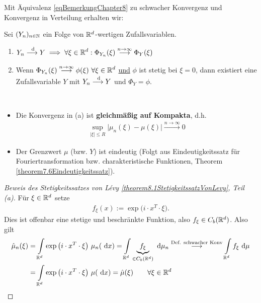 Mit Äquivalenz \eqref{eqBemerkungChapter8} zu schwacher Konvergenz und Konvergenz in Verteilung erhalten wir:

\begin{korollar}\label{korollar8.2}
	Sei $(Y_n)_{n\in\mathbb{N}}$ ein Folge von $\mathbb{R}^d$-wertigen Zufallsvariablen.
	\begin{enumerate}[label=(\alph*)]
		\item $\begin{aligned}
			Y_n\overset{\text{ d}}{\longrightarrow} Y\implies\forall\xi\in\mathbb{R}^d:\Phi_{Y_n}(\xi)\overset{n\to\infty}{\longrightarrow}\Phi_Y(\xi)
		\end{aligned}$
		\item Wenn $\begin{aligned}
			 \Phi_{Y_n}(\xi)\overset{n\to\infty}{\longrightarrow}\phi(\xi)~\forall\xi\in\mathbb{R}^d
		\end{aligned}$
		\underline{und} $\phi$ ist stetig bei $\xi=0$, dann existiert eine Zufallsvariable $Y$ mit $Y_n\overset{\text{ d}}{\longrightarrow}Y$ und $\Phi_Y=\phi$.
	\end{enumerate}
\end{korollar}

\begin{bemerkung}\
	\begin{itemize}
		\item Die Konvergenz in (a) ist \textbf{gleichmäßig auf Kompakta}, d.h.
		\begin{align*}
			\sup\limits_{|\xi|\leq R}\Big|\mu_n(\xi)-\mu(\xi)\Big|\overset{n\to\infty}{\longrightarrow}0
		\end{align*}
		\item Der Grenzwert $\mu$ (bzw. $Y$) ist eindeutig (Folgt aus Eindeutigkeitssatz für Fouriertransformation bzw. charakteristische Funktionen, Theorem \ref{theorem7.6Eindeutigkeitssatz}).
	\end{itemize}
\end{bemerkung}

\begin{proof}[Beweis des Stetigkeitssatzes von Lévy \ref{theorem8.1StetigkeitssatzVonLevy}, Teil (a)]\enter
	Für $\xi\in\mathbb{R}^d$ setze
	\begin{align*}
		f_\xi(x):=\exp\big(i\cdot x^T\cdot\xi\big).
	\end{align*}
	Dies ist offenbar eine stetige und beschränkte Funktion, also $f_\xi\in C_b(\mathbb{R}^d)$.
	Also gilt
	\begin{align*}
		\hat{\mu}_n(\xi)
		&=\int\limits_{\mathbb{R}^d}\exp\big(i\cdot x^T\cdot\xi\big)~\mu_n(\text{ d} x)
		=\int\limits_{\mathbb{R}^d} \underbrace{f_\xi}_{\in C_b(\mathbb{R}^d)}\text{ d}\mu_n
		\overset{\text{Def. schwacher Konv}}{\longrightarrow}
		\int\limits_{\mathbb{R}^d}f_\xi\text{ d}\mu\\
		&=\int\limits_{\mathbb{R}^d}\exp\big(i\cdot x^T\cdot\xi\big)~\mu(\text{ d} x)
		=\hat{\mu}(\xi)
		\qquad\forall\xi\in\mathbb{R}^d
	\end{align*}
\end{proof}

